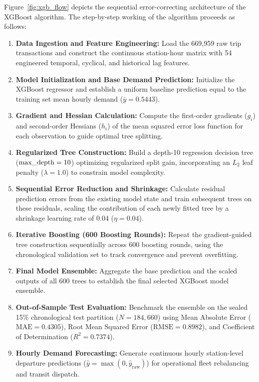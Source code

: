 \documentclass[12pt, a4paper]{article}
\renewcommand{\_}{\textunderscore\allowbreak}
\begin{document}
Figure~\ref{fig:xgb_flow} depicts the sequential error-correcting architecture of the XGBoost algorithm. The step-by-step working of the algorithm proceeds as follows:
\begin{enumerate}
    \item \textbf{Data Ingestion and Feature Engineering:} Load the 669,959 raw trip transactions and construct the continuous station-hour matrix with 54 engineered temporal, cyclical, and historical lag features.
    \item \textbf{Model Initialization and Base Demand Prediction:} Initialize the XGBoost regressor and establish a uniform baseline prediction equal to the training set mean hourly demand ($\bar{y} = 0.5443$).
    \item \textbf{Gradient and Hessian Calculation:} Compute the first-order gradients ($g_i$) and second-order Hessians ($h_i$) of the mean squared error loss function for each observation to guide optimal tree splitting.
    \item \textbf{Regularized Tree Construction:} Build a depth-10 regression decision tree ($\text{max\_depth} = 10$) optimizing regularized split gain, incorporating an $L_2$ leaf penalty ($\lambda = 1.0$) to constrain model complexity.
    \item \textbf{Sequential Error Reduction and Shrinkage:} Calculate residual prediction errors from the existing model state and train subsequent trees on these residuals, scaling the contribution of each newly fitted tree by a shrinkage learning rate of 0.04 ($\eta = 0.04$).
    \item \textbf{Iterative Boosting (600 Boosting Rounds):} Repeat the gradient-guided tree construction sequentially across 600 boosting rounds, using the chronological validation set to track convergence and prevent overfitting.
    \item \textbf{Final Model Ensemble:} Aggregate the base prediction and the scaled outputs of all 600 trees to establish the final selected XGBoost model ensemble.
    \item \textbf{Out-of-Sample Test Evaluation:} Benchmark the ensemble on the sealed 15\% chronological test partition ($N = 184,660$) using Mean Absolute Error ($\text{MAE} = 0.4305$), Root Mean Squared Error ($\text{RMSE} = 0.8982$), and Coefficient of Determination ($R^2 = 0.7374$).
    \item \textbf{Hourly Demand Forecasting:} Generate continuous hourly station-level departure predictions ($\hat{y} = \max(0, \hat{y}_{\text{raw}})$) for operational fleet rebalancing and transit dispatch.
\end{enumerate}
\end{document}
